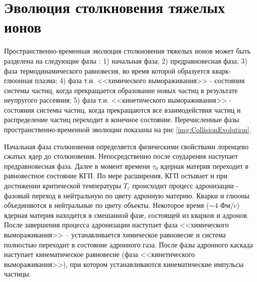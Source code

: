 \begin{comment}
	Переход из КГП в состояние адронного газа называют адронизацией кварк глюонной плазмы. Основными моделями адронизации КГП являются модель рекомбинации и модель фрагментации струн.
	
	\begin{figure}[] 
		\center
		\includegraphics [width = 0,7\linewidth] {Intro/PhaseDiagram.png}
		\caption{Теоретическая фазовая диаграмма ядерной материи для двух безмассовых кварков в зависимости от температуры T и барионного химического потенциала}
		\label{img:PhaseDiagram}  
	\end{figure}
	
	
	Температура перехода соответствует плотности энергии $\epsilon = 1$ ГэВ/фм$^3$, что почти на порядок превышает плотность ядерного вещества $\epsilon_0 = 0,15$ ГэВ/фм$^3$[1407,5003]. Температуры и давления, необходимые для образования кварк-глюонной материи, достигаются в столкновениях тяжелых релятивистских ионоов.
	
	Исследованию КГП в релятивистских столкновениях посвящены такие эксперименты, как PHENIX и STAR (BNL), ALICE(CERN), CBM(JSI), MPD(NICA) и другие.
\end{comment}

\section{Эволюция столкновения тяжелых ионов}

Пространственно-временная эволюция столкновения тяжелых ионов может быть разделена на следующие фазы \cite{QGP_signatures}: 1) начальная фаза; 2) предравновесная фаза; 3) фаза термодинамического равновесия, во время которой образуется кварк-глюонная плазма; 4) фаза т.н. <<химического вымораживания>> - состояния системы частиц, когда прекращается образование новых частиц в результате неупругого рассеяния; 5) фаза т.н. <<кинетического вымораживания>> - состояния системы частиц, когда прекращаются все взаимодействия частиц и распределение частиц переходит в конечное состояние.  
Перечисленные фазы пространственно-временной эволюции показаны на рис  \ref{img:CollisionEvolution}.

Начальная фаза столкновения определяется физическими свойствами лоренцево сжатых ядер до столкновения. Непосредственно после соударения наступает предравновесная фаза. Далее в момент времени $\tau_0$ ядерная материя переходит в равновестное состояние КГП. По мере расширения, КГП остывает и при достижении критической температуры $T_c$ происходит процесс адронизации - фазовый переход в нейтральную по цвету адронную материю. Кварки и глюоны объединяются в нейтральные по цвету объекты. Некоторое время ($\sim 4$ Фм/$c$) ядерная материя находится в смешанной фазе, состоящей из кварков и адронов. После завершения процесса адронизации наступает фаза <<химического вымораживания>> -- устанавливается химическое равновесие и система полностью переходит в состояние адронного газа. После фазы адронного каскада наступает кинематическое равновесие (фаза <<кинетического вымораживания>>), при котором устанавливаются кинематические импульсы частицы.

